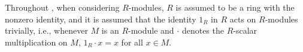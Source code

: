 Throughout , when considering $R$-modules, $R$ is assumed to be a ring with the nonzero identity, and it is assumed that the identity $1_R$ in $R$ acts on $R$-modules trivially, i.e., whenever $M$ is an $R$-module and $\cdot$ denotes the $R$-scalar multiplication on $M$, $1_R\cdot x=x$ for all $x\in M$.